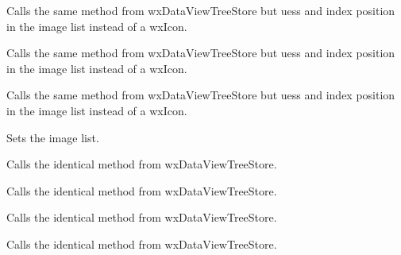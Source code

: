 Calls the same method from wxDataViewTreeStore but uess
and index position in the image list instead of a wxIcon.

\label{wxdataviewtreectrlprependcontainer}


Calls the same method from wxDataViewTreeStore but uess
and index position in the image list instead of a wxIcon.

\label{wxdataviewtreectrlprependitem}


Calls the same method from wxDataViewTreeStore but uess
and index position in the image list instead of a wxIcon.

\label{wxdataviewtreectrlsetimagelist}


Sets the image list.

\label{wxdataviewtreectrlsetitemdata}


Calls the identical method from wxDataViewTreeStore.


\label{wxdataviewtreectrlsetitemexpandedicon}


Calls the identical method from wxDataViewTreeStore.


\label{wxdataviewtreectrlsetitemicon}


Calls the identical method from wxDataViewTreeStore.


\label{wxdataviewtreectrlsetitemtext}


Calls the identical method from wxDataViewTreeStore.
